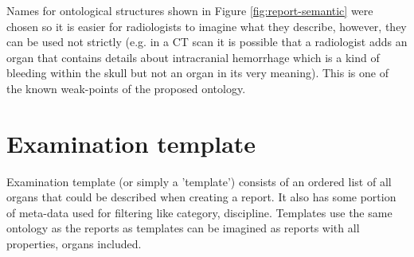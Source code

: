 \documentclass[12pt, twoside, openany]{report}
\theoremstyle{definition}
\begin{document}
Names for ontological structures shown in Figure \ref{fig:report-semantic} were chosen so it is easier for radiologists to imagine what they describe, however, they can be used not strictly (e.g. in a CT scan it is possible that a radiologist adds an organ that contains details about intracranial hemorrhage which is a kind of bleeding within the skull \cite{ich} but not an organ in its very meaning). This is one of the known weak-points of the proposed ontology.

\section{Examination template}
Examination template (or simply a 'template') consists of an ordered list of all organs that could be described when creating a report. It also has some portion of meta-data used for filtering like category, discipline. Templates use the same ontology as the reports as templates can be imagined as reports with all properties, organs included. 
\end{document}
